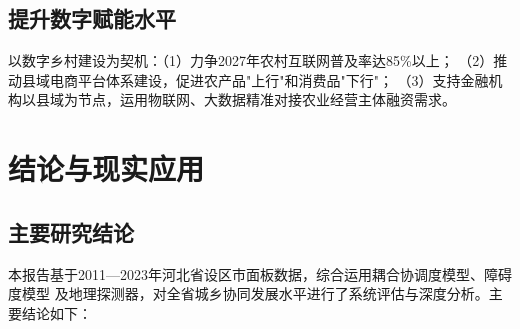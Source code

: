 \documentclass[12pt, a4paper, twoside]{ctexart}
\begin{document}
\subsection{提升数字赋能水平}

以数字乡村建设为契机：（1）力争2027年农村互联网普及率达85\%以上；
（2）推动县域电商平台体系建设，促进农产品"上行"和消费品"下行"；
（3）支持金融机构以县域为节点，运用物联网、大数据精准对接农业经营主体融资需求。

\section{结论与现实应用}

\subsection{主要研究结论}

本报告基于2011—2023年河北省设区市面板数据，综合运用耦合协调度模型、障碍度模型
及地理探测器，对全省城乡协同发展水平进行了系统评估与深度分析。主要结论如下：
\end{document}
